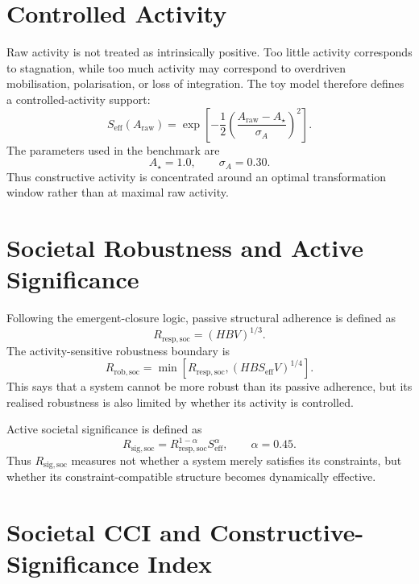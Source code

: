 \documentclass[11pt,a4paper]{article}
\newcommand{\Seff}{S_{\mathrm{eff}}}
\newcommand{\Rresp}{R_{\mathrm{resp,soc}}}
\newcommand{\Rrob}{R_{\mathrm{rob,soc}}}
\newcommand{\Rsig}{R_{\mathrm{sig,soc}}}
\begin{document}
\section{Controlled Activity}

Raw activity is not treated as intrinsically positive.
Too little activity corresponds to stagnation, while too much activity may
correspond to overdriven mobilisation, polarisation, or loss of integration.
The toy model therefore defines a controlled-activity support:
\begin{equation}
\Seff(A_{\mathrm{raw}})
=
\exp\left[
-\frac12
\left(
\frac{A_{\mathrm{raw}}-A_\star}{\sigma_A}
\right)^2
\right].
\label{eq:seff}
\end{equation}
The parameters used in the benchmark are
\begin{equation}
A_\star=1.0,
\qquad
\sigma_A=0.30.
\end{equation}
Thus constructive activity is concentrated around an optimal transformation
window rather than at maximal raw activity.

\section{Societal Robustness and Active Significance}

Following the emergent-closure logic, passive structural adherence is defined
as
\begin{equation}
\Rresp=(H B V)^{1/3}.
\label{eq:rresp}
\end{equation}
The activity-sensitive robustness boundary is
\begin{equation}
\Rrob
=
\min\left[
\Rresp,
(H B \Seff V)^{1/4}
\right].
\label{eq:rrob}
\end{equation}
This says that a system cannot be more robust than its passive adherence, but
its realised robustness is also limited by whether its activity is controlled.

Active societal significance is defined as
\begin{equation}
\Rsig
=
\Rresp^{1-\alpha}\Seff^\alpha,
\qquad
\alpha=0.45.
\label{eq:rsig}
\end{equation}
Thus $\Rsig$ measures not whether a system merely satisfies its constraints,
but whether its constraint-compatible structure becomes dynamically effective.

\section{Societal CCI and Constructive-Significance Index}
\end{document}
